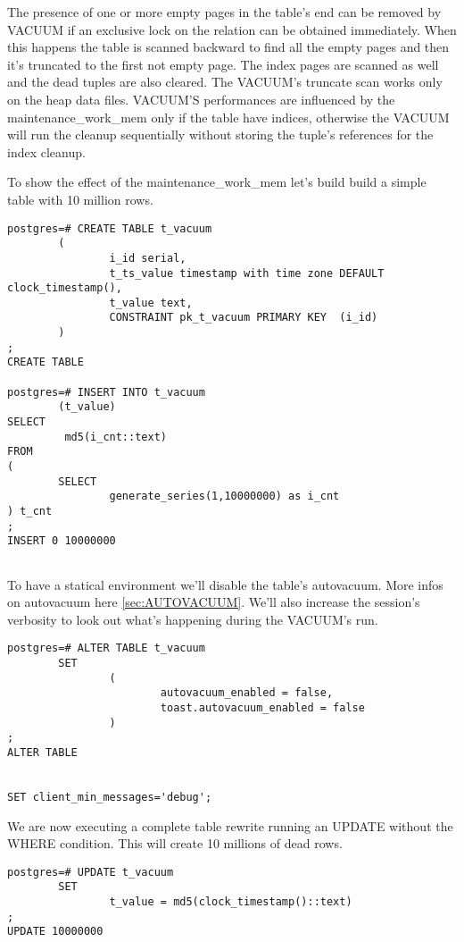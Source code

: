 The presence of one or more empty pages in the table's end can be removed by VACUUM if an 
exclusive lock on the relation can be obtained immediately. When this happens the table is scanned 
backward to find all the empty pages and then it's truncated to the first not empty page. The index 
pages are scanned as well and the dead tuples are also cleared. The VACUUM's truncate scan works 
only on the heap data files. VACUUM'S performances are influenced by the maintenance\_work\_mem 
only if the table have indices, otherwise the VACUUM will run the cleanup sequentially without 
storing the tuple's references for the index cleanup.\newline

To show the effect of the maintenance\_work\_mem  let's build build a simple table with 10 
million rows. 


\begin{lstlisting}[style=pgsql]
postgres=# CREATE TABLE t_vacuum 
        (
                i_id serial,
                t_ts_value timestamp with time zone DEFAULT clock_timestamp(),
                t_value text,
                CONSTRAINT pk_t_vacuum PRIMARY KEY  (i_id)
        )
;
CREATE TABLE

postgres=# INSERT INTO t_vacuum
        (t_value)
SELECT 
         md5(i_cnt::text)
FROM
(
        SELECT
                generate_series(1,10000000) as i_cnt
) t_cnt
;
INSERT 0 10000000


\end{lstlisting}
To have a statical environment we'll disable the table's autovacuum. More infos on autovacuum here 
\ref{sec:AUTOVACUUM}.
We'll also increase the session's verbosity to look out what's happening during the VACUUM's 
 run.\newline
\begin{lstlisting}[style=pgsql]
postgres=# ALTER TABLE t_vacuum 
        SET 
                (
                        autovacuum_enabled = false, 
                        toast.autovacuum_enabled = false
                )
;
ALTER TABLE


SET client_min_messages='debug';

\end{lstlisting}

We are now executing a complete table rewrite running an UPDATE without the WHERE condition. 
This will create 10 millions of dead rows.\newline

\begin{lstlisting}[style=pgsql]
postgres=# UPDATE t_vacuum 
        SET 
                t_value = md5(clock_timestamp()::text)
;
UPDATE 10000000

\end{lstlisting}


